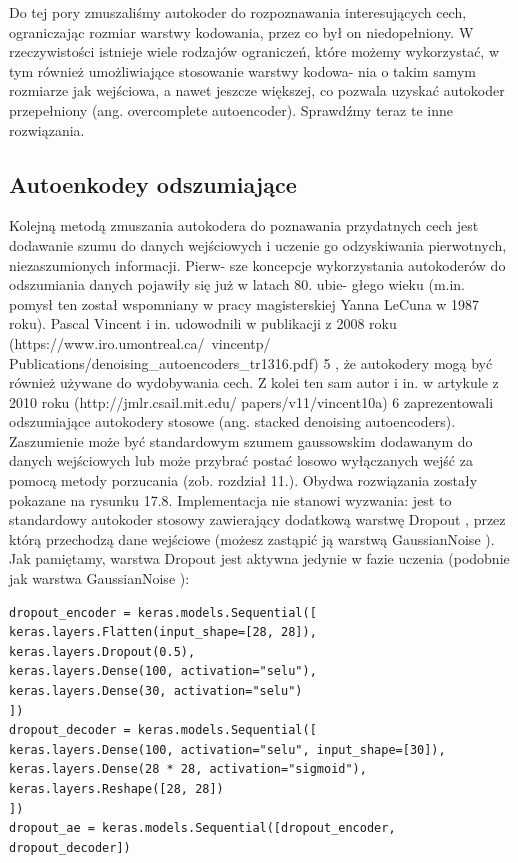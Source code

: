 \documentclass[12pt]{mwbk}
\theoremstyle{plain}
\theoremstyle{definition}
\theoremstyle{remark}
\begin{document}
Do tej pory zmuszaliśmy autokoder do rozpoznawania interesujących cech, ograniczając rozmiar
warstwy kodowania, przez co był on niedopełniony. W rzeczywistości istnieje wiele rodzajów
ograniczeń, które możemy wykorzystać, w tym również umożliwiające stosowanie warstwy kodowa-
nia o takim samym rozmiarze jak wejściowa, a nawet jeszcze większej, co pozwala uzyskać autokoder
przepełniony (ang. overcomplete autoencoder). Sprawdźmy teraz te inne rozwiązania.

\subsection{Autoenkodey odszumiające}

\cite{geron}

Kolejną metodą zmuszania autokodera do poznawania przydatnych cech jest dodawanie szumu
do danych wejściowych i uczenie go odzyskiwania pierwotnych, niezaszumionych informacji. Pierw-
sze koncepcje wykorzystania autokoderów do odszumiania danych pojawiły się już w latach 80. ubie-
głego wieku (m.in. pomysł ten został wspomniany w pracy magisterskiej Yanna LeCuna w 1987 roku).
Pascal Vincent i in. udowodnili w publikacji z 2008 roku (https://www.iro.umontreal.ca/~vincentp/
Publications/denoising\_autoencoders\_tr1316.pdf) 5 , że autokodery mogą być również używane do
wydobywania cech. Z kolei ten sam autor i in. w artykule z 2010 roku (http://jmlr.csail.mit.edu/
papers/v11/vincent10a) 6 zaprezentowali odszumiające autokodery stosowe (ang. stacked denoising
autoencoders).
Zaszumienie może być standardowym szumem gaussowskim dodawanym do danych wejściowych lub
może przybrać postać losowo wyłączanych wejść za pomocą metody porzucania (zob. rozdział 11.).
Obydwa rozwiązania zostały pokazane na rysunku 17.8.
Implementacja nie stanowi wyzwania: jest to standardowy autokoder stosowy zawierający dodatkową
warstwę Dropout , przez którą przechodzą dane wejściowe (możesz zastąpić ją warstwą GaussianNoise ).
Jak pamiętamy, warstwa Dropout jest aktywna jedynie w fazie uczenia (podobnie jak warstwa
GaussianNoise ):
\begin{verbatim}
dropout_encoder = keras.models.Sequential([
keras.layers.Flatten(input_shape=[28, 28]),
keras.layers.Dropout(0.5),
keras.layers.Dense(100, activation="selu"),
keras.layers.Dense(30, activation="selu")
])
dropout_decoder = keras.models.Sequential([
keras.layers.Dense(100, activation="selu", input_shape=[30]),
keras.layers.Dense(28 * 28, activation="sigmoid"),
keras.layers.Reshape([28, 28])
])
dropout_ae = keras.models.Sequential([dropout_encoder, dropout_decoder])
\end{verbatim}
\end{document}
